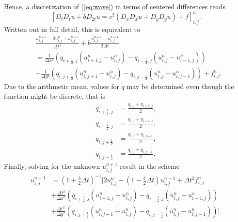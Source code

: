 \documentclass[11pt]{article}
\begin{document}
Hence, a discretization of (\ref{eq:wave}) in terms of centered differences reads
\begin{equation*}
\left[D_t D_t u + b D_{2t} u = c^2(D_x D_x u + D_y D_y u) + f \right]_{i,j}^n.
\end{equation*}
Written out in full detail, this is equivalent to
\begin{align*}
&\frac{u_{i,j}^{n+1} - 2u_{i,j}^n + u_{i,j}^{n-1}} {\Delta t^2} + b\frac{u_{i,j}^{n+1} - u_{i,j}^{n-1}}{2\Delta t} \\
&= \frac{1}{\Delta x^2} \left(q_{i+\frac{1}{2}, j} (u_{i+1,j}^n - u_{i,j}^n) - q_{i-\frac{1}{2}, j}(u_{i,j}^n - u_{i-1,j}^n) \right) \\
&+ \frac{1}{\Delta y^2} \left(q_{i, j+ \frac{1}{2}} (u_{i,j+1}^n - u_{i,j}^n) - q_{i, j-\frac{1}{2}}(u_{i,j}^n - u_{i,j-1}^n) \right) + f_{i,j}^n.
\end{align*}
Due to the arithmetic mean, values for $q$ may be determined even though the function might be discrete, that is
\begin{align*}
q_{i+\frac{1}{2}, j} &= \frac{q_{i,j} + q_{i+1,j}}{2}, \\
q_{i-\frac{1}{2}, j} &= \frac{q_{i,j} + q_{i-1,j}}{2}, \\
q_{i,j+\frac{1}{2}} &= \frac{q_{i,j} + q_{i,j+1}}{2}, \\
q_{i,j-\frac{1}{2}} &= \frac{q_{i,j} + q_{i,j-1}}{2}.
\end{align*} 
Finally, solving for the unknown $u_{i,j}^{n+1}$ result in the scheme
\begin{align}
u_{i,j}^{n+1} &= (1+\frac{b}{2}\Delta t)^{-1} \bigg[2u_{i,j}^n - (1-\frac{b}{2}\Delta t) u_{i,j}^{n-1} + \Delta t^2 f_{i,j}^n \nonumber \\
&+ \frac{\Delta t^2}{\Delta x^2} \left(q_{i+\frac{1}{2},j} (u_{i+1,j}^n - u_{i,j}^n) -  q_{i-\frac{1}{2},j} (u_{i,j}^n - u_{i-1,j}^n) \right) \\
&+ \frac{\Delta t^2}{\Delta y^2} \left(q_{i,j+\frac{1}{2}} (u_{i,j+1}^n - u_{i,j}^n) -  q_{i,j-\frac{1}{2}} (u_{i,j}^n - u_{i,j-1}^n) \right) \bigg]. \nonumber
\end{align}
\end{document}
